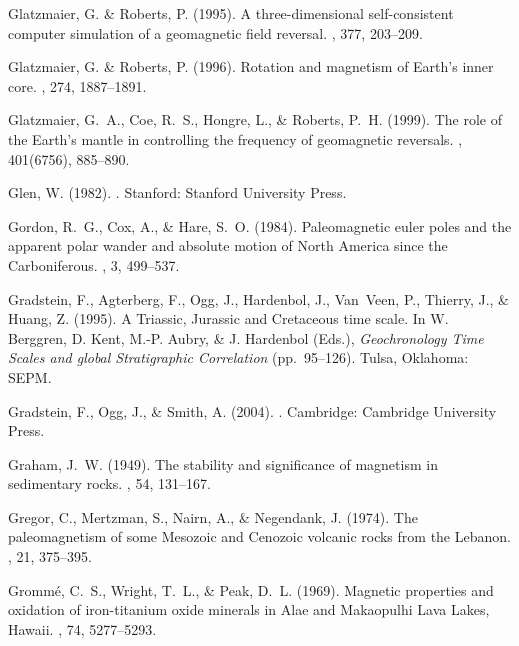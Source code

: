 Glatzmaier, G. \& Roberts, P. (1995).
\newblock A three-dimensional self-consistent computer simulation of a
  geomagnetic field reversal.
, 377, 203--209.

Glatzmaier, G. \& Roberts, P. (1996).
\newblock Rotation and magnetism of Earth's inner core.
, 274, 1887--1891.

Glatzmaier, G.~A., Coe, R.~S., Hongre, L., \& Roberts, P.~H. (1999).
\newblock The role of the Earth's mantle in controlling the frequency of
  geomagnetic reversals.
, 401(6756), 885--890.

Glen, W. (1982).
.
\newblock Stanford: Stanford University Press.

Gordon, R.~G., Cox, A., \& Hare, S.~O. (1984).
\newblock Paleomagnetic euler poles and the apparent polar wander and absolute
  motion of North America since the Carboniferous.
, 3, 499--537.

Gradstein, F., Agterberg, F., Ogg, J., Hardenbol, J., Van~Veen, P., Thierry,
  J., \& Huang, Z. (1995).
\newblock A Triassic, Jurassic and Cretaceous time scale.
\newblock In W. Berggren, D. Kent, M.-P. Aubry, \& J. Hardenbol (Eds.), {\em
  Geochronology Time Scales and global Stratigraphic Correlation}  (pp.\
  95--126). Tulsa, Oklahoma: SEPM.

Gradstein, F., Ogg, J., \& Smith, A. (2004).
.
\newblock Cambridge: Cambridge University Press.

Graham, J.~W. (1949).
\newblock The stability and significance of magnetism in sedimentary rocks.
\newblock {\em J. Geophys. Res.}, 54, 131--167.

Gregor, C., Mertzman, S., Nairn, A., \& Negendank, J. (1974).
\newblock The paleomagnetism of some Mesozoic and Cenozoic volcanic rocks from
  the Lebanon.
, 21, 375--395.

Gromm\'e, C.~S., Wright, T.~L., \& Peak, D.~L. (1969).
\newblock Magnetic properties and oxidation of iron-titanium oxide minerals in
  Alae and Makaopulhi Lava Lakes, Hawaii.
, 74, 5277--5293.

